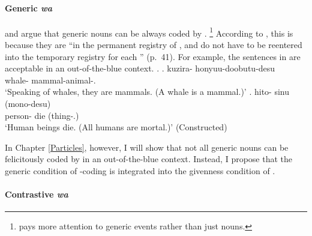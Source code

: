 \paragraph{Generic \textit{wa}}

 and  argue that
generic nouns can be always coded by .%
 \footnote{
  pays more attention to generic events rather than
 just nouns.
 }
According to ,
this is because they are ``in the permanent registry of ,
and do not have to be reentered into the temporary registry for each '' (p.~41).
For example, the sentences in \Next are acceptable in an out-of-the-blue context.
%
\ex.
 \ag. kuzira- honyuu-doobutu-desu \\
      whale- mammal-animal-. \\
      `Speaking of whales, they are mammals. (A whale is a mammal.)'
      \hfill{\cite[44]{kuno73}}
 \bg. hito- sinu (mono-desu) \\
      person- die (thing-.)\\
      `Human beings die. (All humans are mortal.)'
      \hfill{(Constructed)}


In Chapter \ref{Particles}, however,
I will show that not all generic nouns can be felicitously coded by  in an out-of-the-blue context.
Instead, I propose that
the generic condition of -coding is integrated into
the givenness condition of .


\paragraph{Contrastive \textit{wa}}

